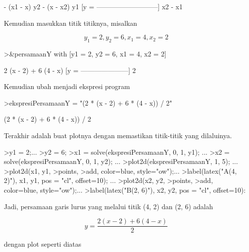 \documentclass[a4paper,10pt]{article}
\begin{document}
\begin{eulernotebook}
\begin{eulercomment}
\begin{eulercomment}
\begin{eulercomment}
\begin{eulercomment}
\begin{euleroutput}
                         - (x1 - x) y2 - (x - x2) y1
                    [y = ---------------------------]
                                   x2 - x1
  
\end{euleroutput}
\begin{eulercomment}
Kemudian masukkan titik titiknya, misalkan\\
\end{eulercomment}
\begin{eulerformula}
\[
y_1 = 2, y_2 = 6, x_1 = 4, x_2 = 2
\]
\end{eulerformula}
\begin{eulerprompt}
>&persamaanY with [y1 = 2, y2 = 6, x1 = 4, x2 = 2]
\end{eulerprompt}
\begin{euleroutput}
  
                            2 (x - 2) + 6 (4 - x)
                       [y = ---------------------]
                                      2
  
\end{euleroutput}
\begin{eulercomment}
Kemudian ubah menjadi ekspresi program
\end{eulercomment}
\begin{eulerprompt}
>ekspresiPersamaanY = "(2 * (x - 2) + 6 * (4 - x)) / 2"
\end{eulerprompt}
\begin{euleroutput}
  (2 * (x - 2) + 6 * (4 - x)) / 2
\end{euleroutput}
\begin{eulercomment}
Terakhir adalah buat plotnya dengan memastikan titik-titik yang
dilaluinya.
\end{eulercomment}
\begin{eulerprompt}
>y1 = 2;...
>y2 = 6;
>x1 = solve(ekspresiPersamaanY, 0, 1, y1); ...
>x2 = solve(ekspresiPersamaanY, 0, 1, y2); ...
>plot2d(ekspresiPersamaanY, 1, 5); ...
>plot2d(x1, y1, >points, >add, color=blue, style="ow");...
>label(latex("A(4, 2)"), x1, y1, pos = "cl", offset=10); ...
>plot2d(x2, y2, >points, >add, color=blue, style="ow");...
>label(latex("B(2, 6)"), x2, y2, pos = "cl", offset=10):
\end{eulerprompt}
\begin{eulercomment}
Jadi, persamaan garis lurus yang melalui titik (4, 2) dan (2, 6)
adalah

\end{eulercomment}
\begin{eulerformula}
\[
y = \frac{2(x - 2) + 6(4 - x)}{2}
\]
\end{eulerformula}
\begin{eulercomment}
dengan plot seperti diatas


\end{eulercomment}
\end{eulercomment}
\end{eulercomment}
\end{eulercomment}
\end{eulercomment}
\end{eulernotebook}
\end{document}
